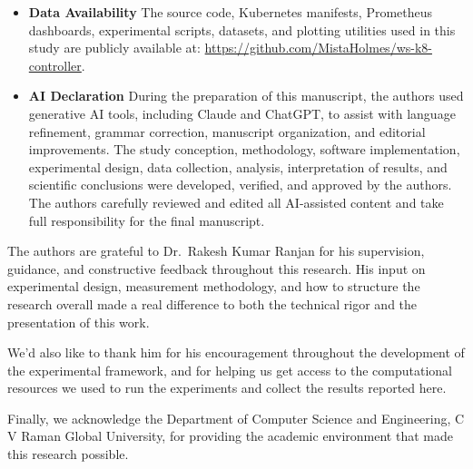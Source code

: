 \documentclass[pdflatex,sn-mathphys-num]{sn-jnl}
\theoremstyle{thmstyleone}%
\theoremstyle{thmstyletwo}%
\theoremstyle{thmstylethree}%
\begin{document}
\begin{itemize}
\item \textbf{Data Availability} The source code, Kubernetes manifests, Prometheus dashboards, experimental scripts, datasets, and plotting utilities used in this study are publicly available at: \url{https://github.com/MistaHolmes/ws-k8-controller}.
\item \textbf{AI Declaration} During the preparation of this manuscript, the authors used generative AI tools, including Claude and ChatGPT, to assist with language refinement, grammar correction, manuscript organization, and editorial improvements. The study conception, methodology, software implementation, experimental design, data collection, analysis, interpretation of results, and scientific conclusions were developed, verified, and approved by the authors. The authors carefully reviewed and edited all AI-assisted content and take full responsibility for the final manuscript.
\end{itemize}


The authors are grateful to Dr.\ Rakesh Kumar Ranjan for his supervision,
guidance, and constructive feedback throughout this research. His input on
experimental design, measurement methodology, and how to structure the research
overall made a real difference to both the technical rigor and the presentation of
this work.

We'd also like to thank him for his encouragement throughout the development of
the experimental framework, and for helping us get access to the computational
resources we used to run the experiments and collect the results reported here.

Finally, we acknowledge the Department of Computer Science and Engineering, C V
Raman Global University, for providing the academic environment that made this
research possible.


\end{document}
